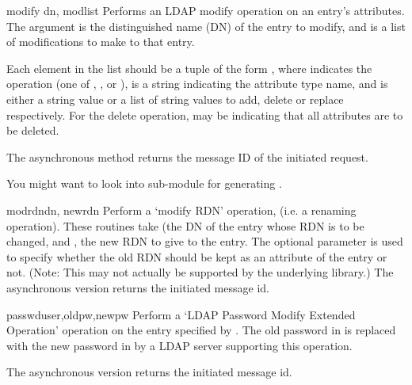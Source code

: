 \begin{methoddesc}[LDAPObject]{modify}{ dn, modlist } %
Performs an LDAP modify operation on an entry's attributes. 
The  argument is the distinguished name (DN) of the entry to modify,
and  is a list of modifications to make to that entry.

Each element in the list  should be a tuple of the form 
,
where  indicates the operation (one of , 
, or ),
 is a string indicating the attribute type name, and 
 is either a string value or a list of string values to add, 
delete or replace respectively.  For the delete operation, 
may be  indicating that all attributes are to be deleted.

The asynchronous method  returns the message ID of the 
initiated request.

You might want to look into sub-module  for
generating .
\end{methoddesc}


\begin{methoddesc}[LDAPObject]{modrdn}{dn, newrdn }
Perform a `modify RDN' operation, (i.e. a renaming operation).
These routines take  (the DN
of the entry whose RDN is to be changed, and , the new RDN to
give to the entry. The optional parameter  is used to specify
whether the old RDN should be kept as an attribute of the entry or not.
(Note: This may not actually be supported by the underlying library.)
The asynchronous version returns the initiated message id.
\end{methoddesc}


\begin{methoddesc}[LDAPObject]{passwd}{user,oldpw,newpw}
Perform a `LDAP Password Modify Extended Operation' operation
on the entry specified by .
The old password in  is replaced with the new
password in  by a LDAP server supporting this operation.

The asynchronous version returns the initiated message id.

\begin{seealso}
\end{seealso}

\end{methoddesc}


